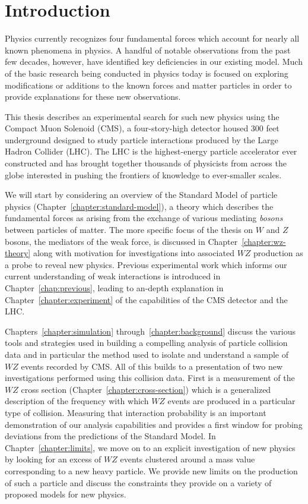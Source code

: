 \chapter{Introduction}

Physics currently recognizes four fundamental forces which account for nearly all known phenomena in physics.  A handful of notable observations from the past few decades, however, have identified key deficiencies in our existing model.  Much of the basic research being conducted in physics today is focused on exploring modifications or additions to the known forces and matter particles in order to provide explanations for these new observations.

This thesis describes an experimental search for such new physics using the Compact Muon Solenoid (CMS), a four-story-high detector housed 300 feet underground designed to study particle interactions produced by the Large Hadron Collider (LHC).  The LHC is the highest-energy particle accelerator ever constructed and has brought together thousands of physicists from across the globe interested in pushing the frontiers of knowledge to ever-smaller scales.

We will start by considering an overview of the Standard Model of particle physics (Chapter~\ref{chapter:standard-model}), a theory which describes the fundamental forces as arising from the exchange of various mediating \emph{bosons} between particles of matter.  The more specific focus of the thesis on $W$ and $Z$ bosons, the mediators of the weak force, is discussed in Chapter~\ref{chapter:wz-theory} along with motivation for investigations into associated $WZ$ production as a probe to reveal new physics.  Previous experimental work which informs our current understanding of weak interactions is introduced in Chapter~\ref{chap:previous}, leading to an-depth explanation in Chapter~\ref{chapter:experiment} of the capabilities of the CMS detector and the LHC.

Chapters~\ref{chapter:simulation} through~\ref{chapter:background} discuss the various tools and strategies used in building a compelling analysis of particle collision data and in particular the method used to isolate and understand a sample of $WZ$ events recorded by CMS.  All of this builds to a presentation of two new investigations performed using this collision data.  First is a measurement of the $WZ$ cross section (Chapter~\ref{chapter:cross-section}) which is a generalized description of the frequency with which $WZ$ events are produced in a particular type of collision.  Measuring that interaction probability is an important demonstration of our analysis capabilities and provides a first window for probing deviations from the predictions of the Standard Model.  In Chapter~\ref{chapter:limits}, we move on to an explicit investigation of new physics by looking for an excess of $WZ$ events clustered around a mass value corresponding to a new heavy particle.  We provide new limits on the production of such a particle and discuss the constraints they provide on a variety of proposed models for new physics.

